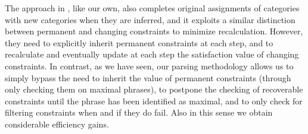 \documentclass{llncs}
\begin{document}
The approach in \cite{DB04}, like our own, also completes original assignments of categories with
new categories when they are inferred, and it exploits a similar distinction between permanent and changing constraints to minimize recalculation. However, they need to explicitly inherit permanent constraints at each step, and to recalculate and eventually update at each step the satisfaction value of changing constraints. In contrast, as we have seen, our parsing methodology allows us to  simply bypass the need to inherit the value of permanent constraints (through only checking them on maximal phrases), to postpone the checking of recoverable constraints until the phrase has been identified as maximal, and to only check for filtering constraints when and if they do fail. Also in this sense we obtain considerable efficiency gains.


 
\end{document}
